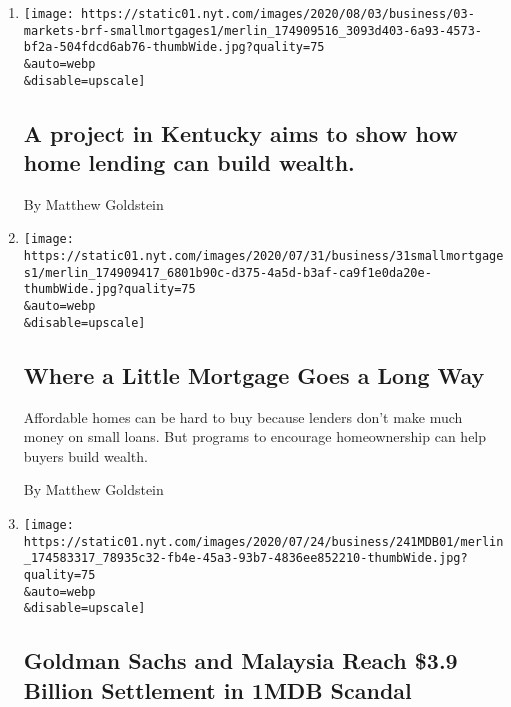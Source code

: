 \begin{enumerate}
\def\labelenumi{\arabic{enumi}.}
\item
  \href{/2020/08/03/business/a-project-in-kentucky-aims-to-show-how-home-lending-can-build-wealth.html}{}

  \texttt{[image: https://static01.nyt.com/images/2020/08/03/business/03-markets-brf-smallmortgages1/merlin\_174909516\_3093d403-6a93-4573-bf2a-504fdcd6ab76-thumbWide.jpg?quality=75\\\&auto=webp\\\&disable=upscale]}

  \hypertarget{a-project-in-kentucky-aims-to-show-how-home-lending-can-build-wealth}{%
  \subsection{A project in Kentucky aims to show how home lending can
  build
  wealth.}\label{a-project-in-kentucky-aims-to-show-how-home-lending-can-build-wealth}}

  By Matthew Goldstein
\item
  \href{/2020/08/02/business/mortgages-affordable-housing.html}{}

  \texttt{[image: https://static01.nyt.com/images/2020/07/31/business/31smallmortgages1/merlin\_174909417\_6801b90c-d375-4a5d-b3af-ca9f1e0da20e-thumbWide.jpg?quality=75\\\&auto=webp\\\&disable=upscale]}

  \hypertarget{where-a-little-mortgage-goes-a-long-way}{%
  \subsection{Where a Little Mortgage Goes a Long
  Way}\label{where-a-little-mortgage-goes-a-long-way}}

  Affordable homes can be hard to buy because lenders don't make much
  money on small loans. But programs to encourage homeownership can help
  buyers build wealth.

  By Matthew Goldstein
\item
  \href{/2020/07/24/business/goldman-sachs-malaysia-1mdb.html}{}

  \texttt{[image: https://static01.nyt.com/images/2020/07/24/business/241MDB01/merlin\_174583317\_78935c32-fb4e-45a3-93b7-4836ee852210-thumbWide.jpg?quality=75\\\&auto=webp\\\&disable=upscale]}

  \hypertarget{goldman-sachs-and-malaysia-reach-39-billion-settlement-in-1mdb-scandal}{%
  \subsection{Goldman Sachs and Malaysia Reach \$3.9 Billion Settlement
  in 1MDB
  Scandal}\label{goldman-sachs-and-malaysia-reach-39-billion-settlement-in-1mdb-scandal}}


\end{enumerate}
